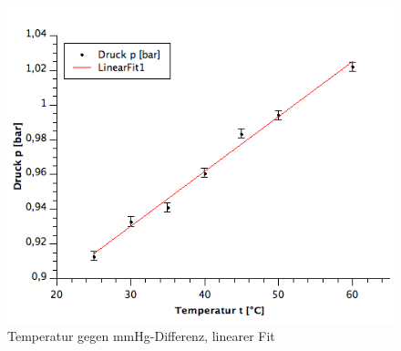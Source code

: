 \documentclass[12pt,a4paper]{article}
\begin{document}
\begin{figure}[H]
	\centering
	\includegraphics[scale=0.60]{./figure/Spannungskoeffizient-lin_Fit.png}
	\caption{Temperatur gegen mmHg-Differenz, linearer Fit}
	\label{fig:gas_therm_Spannungskoeffizient}
\end{figure}
\end{document}
